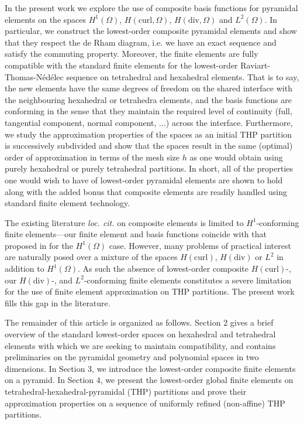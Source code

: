 \documentclass[twoside,reqno,final]{amsart}
\newcommand{\NED}{N\'ed\'elec }
\begin{document}
In the present work we explore the use of composite basis functions for
pyramidal elements on the spaces $H^1(\Omega)$, $H(\mathrm{curl},\Omega)$,
$H(\mathrm{div},\Omega)$ and $L^2(\Omega)$. In particular, we construct the
lowest-order composite pyramidal elements and show that they respect the de
Rham diagram, i.e. we have an exact sequence and satisfy the commuting
property. Moreover, the finite elements are fully compatible with the standard
finite elements for the lowest-order {Raviart-Thomas-\NED}sequence
\cite{Nedelec80,ArnoldLogg14} on tetrahedral and hexahedral elements. That is
to say, the new elements have the same degrees of freedom on the shared
interface with the neighbouring hexahedral or tetrahedra elements, and the
basis functions are conforming in the sense that they maintain the required
level of continuity (full, tangential component, normal component, ...) across
the interface. Furthermore, we study the approximation properties of the spaces
as an initial THP partition is successively subdivided and show that the spaces
result in the same (optimal) order of approximation in terms of the mesh size
$h$ as one would obtain using purely hexahedral or purely tetrahedral
partitions. In short, all of the properties one would wish to have of
lowest-order pyramidal elements are shown to hold along with the added bonus
that composite elements are readily handled using standard finite element
technology. 

The existing literature \emph{loc. cit.} on composite elements is limited to
$H^1$-conforming finite elements---our finite element and basis functions
coincide with that proposed in \cite{Wieners97} for the $H^1(\Omega)$ case.
However, many problems of practical interest are naturally posed over a mixture
of the spaces $H(\mathrm{curl})$, $H(\mathrm{div})$ or $L^2$ in addition to
$H^1(\Omega)$.  As such the absence of lowest-order composite
$H(\mathrm{curl})$-, our $H(\mathrm{div})$-, and $L^2$-conforming finite
elements constitutes a severe limitation for the use of finite element
approximation on THP partitions. The present work fills this gap in the
literature. 

The remainder of this article is organized as follows. Section 2 gives a brief
overview of the standard lowest-order spaces on hexahedral and tetrahedral
elements with which we are seeking to maintain compatibility, and contains
preliminaries on the pyramidal geometry and polynomial spaces in two
dimensions.  In Section 3, we introduce the lowest-order composite finite
elements on a pyramid.  In Section 4, we present the lowest-order global finite
elements on tetrahedral-hexahedral-pyramidal ({\sf THP}) partitions and prove
their approximation properties on a sequence of uniformly refined (non-affine)
{\sf THP} partitions. 
\end{document}
